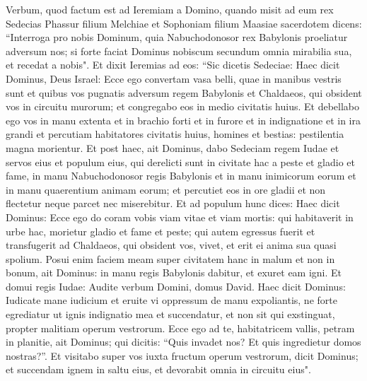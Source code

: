 \begin{biblechapter}  
\verse Verbum, quod factum est ad Ieremiam a Domino, quando misit ad eum rex Sedecias Phassur filium Melchiae et Sophoniam filium Maasiae sacerdotem dicens: 
\verse “Interroga pro nobis Dominum, quia Nabuchodonosor rex Babylonis proeliatur adversum nos; si forte faciat Dominus nobiscum secundum omnia mirabilia sua, et recedat a nobis". 
\verse Et dixit Ieremias ad eos: “Sic dicetis Sedeciae: 
\verse Haec dicit Dominus, Deus Israel: Ecce ego convertam vasa belli, quae in manibus vestris sunt et quibus vos pugnatis adversum regem Babylonis et Chaldaeos, qui obsident vos in circuitu murorum; et congregabo eos in medio civitatis huius. 
\verse Et debellabo ego vos in manu extenta et in brachio forti et in furore et in indignatione et in ira grandi 
\verse et percutiam habitatores civitatis huius, homines et bestias: pestilentia magna morientur. 
\verse Et post haec, ait Dominus, dabo Sedeciam regem Iudae et servos eius et populum eius, qui derelicti sunt in civitate hac a peste et gladio et fame, in manu Nabuchodonosor regis Babylonis et in manu inimicorum eorum et in manu quaerentium animam eorum; et percutiet eos in ore gladii et non flectetur neque parcet nec miserebitur. 
\verse Et ad populum hunc dices: Haec dicit Dominus: Ecce ego do coram vobis viam vitae et viam mortis: 
\verse qui habitaverit in urbe hac, morietur gladio et fame et peste; qui autem egressus fuerit et transfugerit ad Chaldaeos, qui obsident vos, vivet, et erit ei anima sua quasi spolium. 
\verse Posui enim faciem meam super civitatem hanc in malum et non in bonum, ait Dominus: in manu regis Babylonis dabitur, et exuret eam igni. 
\verse Et domui regis Iudae: Audite verbum Domini, 
\verse domus David. Haec dicit Dominus: Iudicate mane iudicium et eruite vi oppressum de manu expoliantis, ne forte egrediatur ut ignis indignatio mea et succendatur, et non sit qui exstinguat, propter malitiam operum vestrorum. 
\verse Ecce ego ad te, habitatricem vallis, petram in planitie, ait Dominus; qui dicitis: “Quis invadet nos? Et quis ingredietur domos nostras?”. 
\verse Et visitabo super vos iuxta fructum operum vestrorum, dicit Dominus; et succendam ignem in saltu eius, et devorabit omnia in circuitu eius". 
\end{biblechapter}

